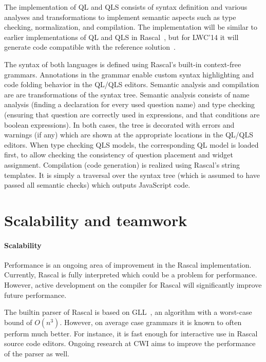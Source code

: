 \documentclass[a4paper]{article}
\begin{document}
The implementation of QL and QLS consists of syntax definition and
various analyses and transformations to implement semantic aspects
such as type checking, normalization, and compilation. The
implementation will be similar to earlier implementations of QL and
QLS in Rascal~\cite{QLRKemi,Demoqles}, but for LWC'14 it will generate
code compatible with the reference solution~\cite{ReferenceImpl}.

The syntax of both languages is defined using Rascal's built-in
context-free grammars. Annotations in the grammar enable custom syntax
highlighting and code folding behavior in the QL/QLS editors. Semantic
analysis and compilation are are transformations of the syntax tree.
Semantic analysis consists of name analysis (finding a declaration for
every used question name) and type checking (ensuring that question
are correctly used in expressions, and that conditions are boolean
expressions). In both cases, the tree is decorated with errors and
warnings (if any) which are shown at the appropriate locations in the
QL/QLS editors. When type checking QLS models, the corresponding QL
model is loaded first, to allow checking the consistency of question
placement and widget assignment. Compilation (code generation) is
realized using Rascal's string templates. It is simply a traversal
over the syntax tree (which is assumed to have passed all semantic
checks) which outputs JavaScript code.



\section{Scalability and teamwork}

\paragraph{Scalability}
Performance is an ongoing area of improvement in the Rascal
implementation. Currently, Rascal is fully interpreted which could be
a problem for performance. However, active development on the compiler
for Rascal will significantly improve future performance.

The builtin parser of Rascal is based on GLL~\cite{GLLPTGEN}, an
algorithm with a worst-case bound of $O(n^3)$. However, on average
case grammars it is known to often perform much better. For instance,
it is fast enough for interactive use in Rascal source code editors.
Ongoing research at CWI aims to improve the performance of the parser
as well.
\end{document}
